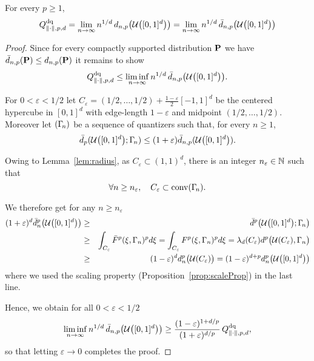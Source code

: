 \begin{prop}\label{prop:rateUNN} For every $p\ge 1$, 
\[ 
Q^{\text{dq}}_{\lVert\cdot\rVert, p, d} = \lim_{n\to\infty} n^{1/d}\, d_{n,p}\bigl(\mathcal{U}\bigl([0,1]^d\bigr) \bigr)  = \lim_{n\to\infty} n^{1/d}\,
\bar d_{n,p}\bigl(\mathcal{U}\bigl([0,1]^d\bigr) \bigr) 
\]
\end{prop}
\begin{proof}
Since for every compactly supported distribution $\mathbf{P}$ we have $\bar d_{n,p}(\mathbf{P}) \leq  d_{n,p}(\mathbf{P})$
it remains to show
\[
	Q^{\text{dq}}_{\lVert\cdot\rVert, p, d} \leq \liminf_{n\to\infty} n^{1/d}\, \bar d_{n,p}\bigl(\mathcal{U}\bigl([0,1]^d\bigr) \bigr).
\]


For $0 < \varepsilon < 1/2$ let $C_\varepsilon= (1/2,\ldots,1/2)+
\frac{1-\varepsilon}{2}[-1,1]^d$ be the centered hypercube in $[0,1]^d$ with
edge-length $1-\varepsilon$ and midpoint $(1/2,\ldots,1/2)$.
Moreover let $(\Gamma_{\!n})$ be a sequence of quantizers such that, for every $n\ge 1$, 
\[
\bar d_{p}(\mathcal{U}\bigl([0,1]^d\bigr); \Gamma_{\!n}) \leq (1+\varepsilon) \bar d_{n,p}(\mathcal{U}\bigl([0,1]^d\bigr)).
\]

Owing to Lemma~\ref{lem:radius}, as $C_{\varepsilon} \subset (1,1)^d$, there is an integer $n_\varepsilon \in \mathbb{N}$ such
that \[ \forall n \geq n_\varepsilon, \quad C_\varepsilon \subset
\operatorname{conv}(\Gamma_{\!n}) . 
\]

We therefore get for any $n\geq n_\varepsilon$
 \begin{eqnarray*}
 (1+\varepsilon)^d\bar d^p_{n}\bigl(\mathcal{U}\bigl([0,1]^d\bigr) \bigr)& \geq &\bar d^p\bigl(\mathcal{U}\bigl([0,1]^d\bigr);\Gamma_{\!n} \bigr)\\
 &\ge & \int _{C_{\varepsilon}}\bar F^p(\xi,\Gamma_n)^pd\xi=\int _{C_{\varepsilon}} F^p(\xi,\Gamma_n)^pd\xi= \lambda_d(C_{\varepsilon}) d^p \bigl(\mathcal{U}(C_\varepsilon), \Gamma_n\bigr) \\
&\ge& (1 - \varepsilon)^{d} d^p_{n}\bigl(\mathcal{U}(C_\varepsilon)\bigr)  = (1 - \varepsilon)^{d+p} d^p_{n}\bigl(\mathcal{U}\bigl([0,1]^d\bigr) \bigr) 
\end{eqnarray*}
where we used the scaling property (Proposition~\ref{prop:scaleProp}) in the last line.

Hence, we obtain for all $0 < \varepsilon < 1/2$
\[
\liminf_{n\to\infty} n^{1/d}\, \bar d_{n,p}\bigl(\mathcal{U}\bigl([0,1]^d\bigr) \bigr) \geq \frac{(1 -
\varepsilon)^{1+d/p}}{(1+\varepsilon)^{d/p}}\, Q^{\text{dq}}_{\lVert\cdot\rVert, p, d},
\]
so that letting $\varepsilon \to 0$ completes the proof. 
\end{proof}

